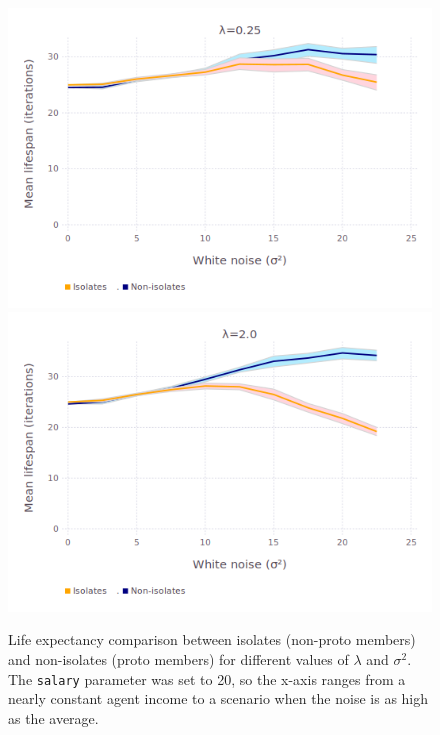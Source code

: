 \begin{figure}[ht]
\centering
\includegraphics[width=\columnwidth]{figures/avgLifespanLambda_025.png}
\includegraphics[width=\columnwidth]{figures/avgLifespanLambda2.png}
\caption{Life expectancy comparison between isolates (non-proto members) and
non-isolates (proto members) for different values of $\lambda$ and $\sigma^2$.
The \texttt{salary} parameter was set to 20, so the x-axis ranges from a nearly
constant agent income to a scenario when the noise is as high as the average.}
\label{fig:avgLifespanLambda}
\end{figure}

